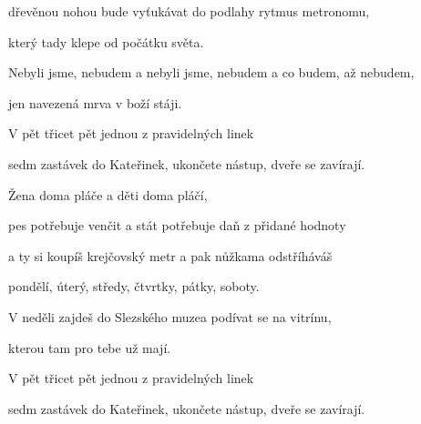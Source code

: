 dřevěnou nohou bude vyťukávat do podlahy rytmus metronomu,

který tady klepe od počátku světa.

Nebyli jsme, nebudem a nebyli jsme, nebudem a co budem, až nebudem,

jen navezená mrva v boží stáji.

V pět třicet pět jednou z pravidelných linek

sedm zastávek do Kateřinek, ukončete nástup, dveře se zavírají.
\ks

\zs
Žena doma pláče a děti doma pláčí,

pes potřebuje venčit a stát potřebuje daň z přidané hodnoty

a ty si koupíš krejčovský metr a pak nůžkama odstříháváš

pondělí, úterý, středy, čtvrtky, pátky, soboty.

V neděli zajdeš do Slezského muzea podívat se na vitrínu,

kterou tam pro tebe už mají.

V pět třicet pět jednou z pravidelných linek

sedm zastávek do Kateřinek, ukončete nástup, dveře se zavírají.
\ks

\kp
